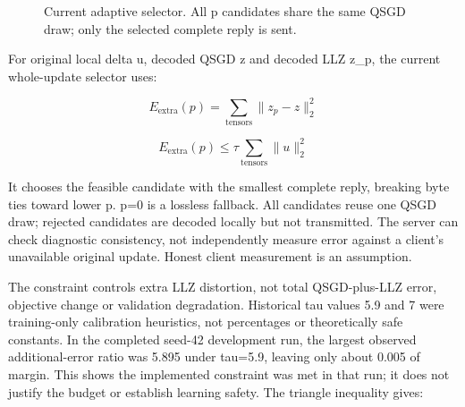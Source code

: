 \documentclass[11pt,a4paper]{article}
\begin{document}
\begin{figure}[htbp]\centering
{}
\caption{Current adaptive selector. All p candidates share the same QSGD draw; only the selected complete reply is sent.}
\label{fig:adaptive}
\end{figure}

For original local delta u, decoded QSGD z and decoded LLZ z\_p, the current whole-update selector uses:

\begin{equation*}E_{\mathrm{extra}}(p)=\sum_{\mathrm{tensors}}\|z_p-z\|_2^2\end{equation*}

\begin{equation*}E_{\mathrm{extra}}(p)\leq \tau\sum_{\mathrm{tensors}}\|u\|_2^2\end{equation*}

It chooses the feasible candidate with the smallest complete reply, breaking byte ties toward lower p. p=0 is a lossless fallback. All candidates reuse one QSGD draw; rejected candidates are decoded locally but not transmitted. The server can check diagnostic consistency, not independently measure error against a client's unavailable original update. Honest client measurement is an assumption.

The constraint controls extra LLZ distortion, not total QSGD-plus-LLZ error, objective change or validation degradation. Historical tau values 5.9 and 7 were training-only calibration heuristics, not percentages or theoretically safe constants. In the completed seed-42 development run, the largest observed additional-error ratio was 5.895 under tau=5.9, leaving only about 0.005 of margin. This shows the implemented constraint was met in that run; it does not justify the budget or establish learning safety. The triangle inequality gives:
\end{document}
